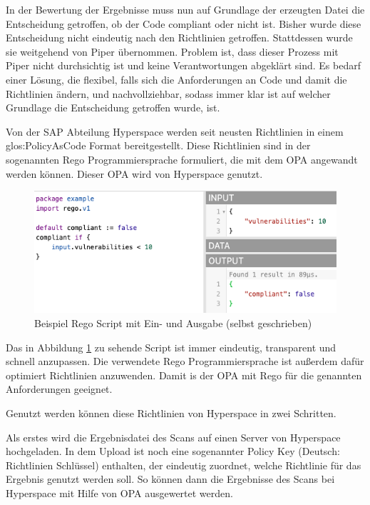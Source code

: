 \documentclass[../main.tex]{subfiles}
\begin{document}
In der Bewertung der Ergebnisse muss nun auf Grundlage der erzeugten Datei die Entscheidung getroffen, ob der Code compliant oder nicht ist.
Bisher wurde diese Entscheidung nicht eindeutig nach den Richtlinien getroffen.
Stattdessen wurde sie weitgehend von Piper übernommen.
Problem ist, dass dieser Prozess mit Piper nicht durchsichtig ist und keine Verantwortungen abgeklärt sind.
Es bedarf einer Lösung, die flexibel, falls sich die Anforderungen an Code und damit die Richtlinien ändern, und nachvollziehbar, sodass immer klar ist auf welcher Grundlage die Entscheidung getroffen wurde, ist.

Von der SAP Abteilung Hyperspace werden seit neusten Richtlinien in einem \gls{glos:PolicyAsCode} Format bereitgestellt.
Diese Richtlinien sind in der sogenannten Rego Programmiersprache formuliert, die mit dem \gls{OPA} angewandt werden können.
Dieser \gls{OPA} wird von Hyperspace genutzt.

\begin{figure}[ht]
    \centering
    \includegraphics[scale=0.65]{bilder/regoexample.png}
    \caption{Beispiel Rego Script mit Ein- und Ausgabe (selbst geschrieben)}
    \label{fig:regoexample}
\end{figure}

Das in Abbildung \ref{fig:regoexample} zu sehende Script ist immer eindeutig, transparent und schnell anzupassen.
Die verwendete Rego Programmiersprache ist außerdem dafür optimiert Richtlinien anzuwenden.
Damit is der \gls{OPA} mit Rego für die genannten Anforderungen geeignet.
\cite{Rego}

Genutzt werden können diese Richtlinien von Hyperspace in zwei Schritten.

Als erstes wird die Ergebnisdatei des Scans auf einen Server von Hyperspace hochgeladen.
In dem Upload ist noch eine sogenannter Policy Key (Deutsch: Richtlinien Schlüssel) enthalten, der eindeutig zuordnet, welche Richtlinie für das Ergebnis genutzt werden soll.
So können dann die Ergebnisse des Scans bei Hyperspace mit Hilfe von \gls{OPA} ausgewertet werden.
\end{document}
